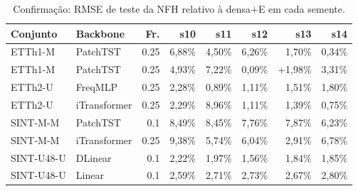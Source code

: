 \begin{table}[htbp]
\centering
\scriptsize
\setlength{\tabcolsep}{2pt}
\caption{Confirma\c{c}\~ao: RMSE de teste da NFH relativo \`a densa+E em cada semente.}\label{tab:conf_semente}
\begin{tabular}{llrrrrrr}
\toprule
Conjunto & Backbone & Fr. & s10 & s11 & s12 & s13 & s14 \\ \midrule
ETTh1-M & PatchTST & 0.25 & \textminus{}6,88\% & \textminus{}4,50\% & \textminus{}6,26\% & \textminus{}1,70\% & \textminus{}0,34\% \\
ETTh1-M & PatchTST & 0.25 & \textminus{}4,93\% & \textminus{}7,22\% & \textminus{}0,09\% & +1,98\% & \textminus{}3,31\% \\
ETTh2-U & FreqMLP & 0.25 & \textminus{}2,28\% & \textminus{}0,89\% & \textminus{}1,11\% & \textminus{}1,51\% & \textminus{}1,80\% \\
ETTh2-U & iTransformer & 0.25 & \textminus{}2,29\% & \textminus{}8,96\% & \textminus{}1,11\% & \textminus{}1,39\% & \textminus{}0,75\% \\
SINT-M-M & PatchTST & 0.1 & \textminus{}8,49\% & \textminus{}8,45\% & \textminus{}7,76\% & \textminus{}7,87\% & \textminus{}6,23\% \\
SINT-M-M & iTransformer & 0.25 & \textminus{}9,38\% & \textminus{}5,74\% & \textminus{}6,04\% & \textminus{}2,91\% & \textminus{}6,78\% \\
SINT-U48-U & DLinear & 0.1 & \textminus{}2,22\% & \textminus{}1,97\% & \textminus{}1,56\% & \textminus{}1,84\% & \textminus{}1,85\% \\
SINT-U48-U & Linear & 0.1 & \textminus{}2,59\% & \textminus{}2,71\% & \textminus{}2,73\% & \textminus{}2,67\% & \textminus{}2,80\% \\
\bottomrule
\end{tabular}
\par{}
\end{table}
